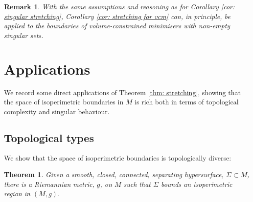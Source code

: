 \documentclass[12pt]{article}
\newtheorem{theorem}{Theorem}
\newtheorem{remark}{Remark}
\begin{document}
\begin{remark}
    With the same assumptions and reasoning as for Corollary \ref{cor: singular stretching}, Corollary \ref{cor: stretching for vcm} can, in principle, be applied to the boundaries of volume-constrained minimisers with non-empty singular sets.
\end{remark}


\section{Applications}\label{sec: applications}

We record some direct applications of Theorem \ref{thm: stretching}, showing that the space of isoperimetric boundaries in $M$ is rich both in terms of topological complexity and singular behaviour.

\subsection{Topological types}\label{subsec: topology}

We show that the space of isoperimetric boundaries is topologically diverse:

\begin{theorem}\label{thm: topological constructions}
    Given a smooth, closed, connected, separating hypersurface, $\Sigma \subset M$, there is a Riemannian metric, $g$, on $M$ such that $\Sigma$ bounds an isoperimetric region in $(M,g)$.
\end{theorem}
\end{document}

